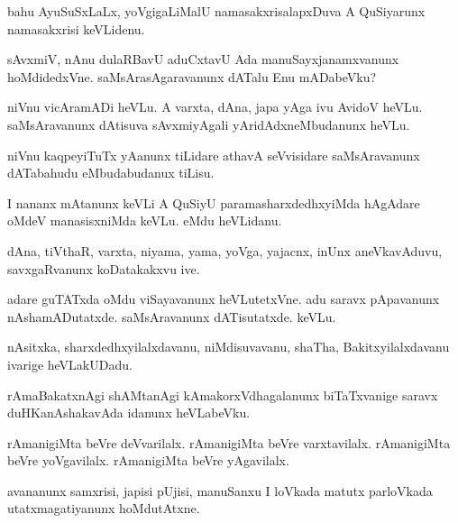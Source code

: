 \documentclass{article}
\begin{document}
\begin{mn}%
bahu AyuSuSxLaLx, yoVgigaLiMalU namasakxrisalapxDuva A QuSiyarunx namasakxrisi keVLidenu.
\end{mn}

\begin{mn}%
sAvxmiV, nAnu dulaRBavU aduCxtavU Ada manuSayxjanamxvanunx hoMdidedxVne. saMsArasAgaravanunx 
dATalu Enu mADabeVku?
\end{mn}

\begin{mn}%
niVnu vicAramADi heVLu. A varxta, dAna, japa yAga ivu AvidoV heVLu. saMsAravanunx dAtisuva 
sAvxmiyAgali yAridAdxneMbudanunx heVLu.
\end{mn}

\begin{mn}%
niVnu kaqpeyiTuTx yAanunx tiLidare athavA seVvisidare saMsAravanunx dATabahudu 
eMbudabudanux tiLisu.
\end{mn}

\begin{mn}%
I nananx mAtanunx keVLi A QuSiyU paramasharxdedhxyiMda hAgAdare oMdeV manasisxniMda keVLu. 
eMdu heVLidanu.
\end{mn}

\begin{mn}%
dAna, tiVthaR, varxta, niyama, yama, yoVga, yajacnx, inUnx aneVkavAduvu, savxgaRvanunx 
koDatakakxvu ive.
\end{mn}

\begin{mn}%
adare guTATxda oMdu viSayavanunx heVLutetxVne. adu saravx pApavanunx nAshamADutatxde. 
saMsAravanunx dATisutatxde. keVLu.
\end{mn}

\begin{mn}%
nAsitxka, sharxdedhxyilalxdavanu, niMdisuvavanu, shaTha, Bakitxyilalxdavanu ivarige 
heVLakUDadu.
\end{mn}

\begin{mn}%
rAmaBakatxnAgi shAMtanAgi kAmakorxVdhagalanunx biTaTxvanige saravx duHKanAshakavAda idanunx 
heVLabeVku.
\end{mn}

\begin{mn}%
rAmanigiMta beVre deVvarilalx. rAmanigiMta beVre varxtavilalx. rAmanigiMta beVre 
yoVgavilalx. rAmanigiMta beVre yAgavilalx.
\end{mn}

\begin{mn}%
avananunx samxrisi, japisi pUjisi, manuSanxu I loVkada matutx parloVkada utatxmagatiyanunx 
hoMdutAtxne.
\end{mn}
\end{document}
